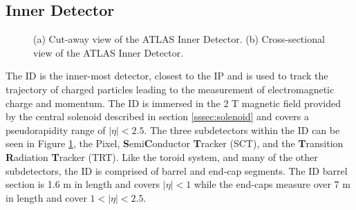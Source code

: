 	\subsection{Inner Detector}\label{ssec:ID}
		\begin{figure}[!ht]
		\centering
		\caption{\label{fig:ATLAS-ID} (a) Cut-away view of the ATLAS Inner Detector. (b) Cross-sectional view of the ATLAS Inner Detector.}
		\end{figure}

		The ID is the inner-most detector, closest to the IP and is used to track the trajectory of charged particles leading to the measurement of electromagnetic charge and momentum. The ID is immersed in the 2 T magnetic field provided by the central solenoid described in section \ref{sssec:solenoid} and covers a pseudorapidity range of $|\eta|<2.5$. The three subdetectors within the ID can be seen in Figure \ref{fig:ATLAS-ID}, the Pixel, \textbf{S}emi\textbf{C}onductor \textbf{T}racker (SCT), and the \textbf{T}ransition \textbf{R}adiation \textbf{T}racker (TRT). Like the toroid system, and many of the other subdetectors, the ID is comprised of barrel and end-cap segments. The ID barrel section is 1.6 m in length and covers $|\eta|<1$ while the end-caps measure over 7 m in length and cover $1 < |\eta| < 2.5$. 

